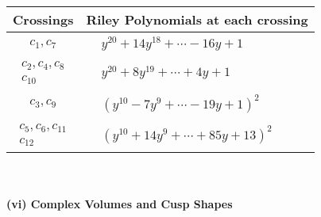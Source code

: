 \documentclass[1p]{elsarticle_modified}
\theoremstyle{definition}
\begin{document}
\begin{tabular}{m{50pt}|m{274pt}}
Crossings & \hspace{64pt}Riley Polynomials at each crossing \\
\hline $$\begin{aligned}c_{1},c_{7}\end{aligned}$$&$\begin{aligned}
&y^{20}+14 y^{18}+\cdots-16 y+1
\end{aligned}$\\
\hline $$\begin{aligned}c_{2},c_{4},c_{8}\\c_{10}\end{aligned}$$&$\begin{aligned}
&y^{20}+8 y^{19}+\cdots+4 y+1
\end{aligned}$\\
\hline $$\begin{aligned}c_{3},c_{9}\end{aligned}$$&$\begin{aligned}
&(y^{10}-7 y^9+\cdots-19 y+1)^{2}
\end{aligned}$\\
\hline $$\begin{aligned}c_{5},c_{6},c_{11}\\c_{12}\end{aligned}$$&$\begin{aligned}
&(y^{10}+14 y^9+\cdots+85 y+13)^{2}
\end{aligned}$\\
\hline
\end{tabular}\\~\\
\newpage\flushleft \textbf{(vi) Complex Volumes and Cusp Shapes}
\end{document}
